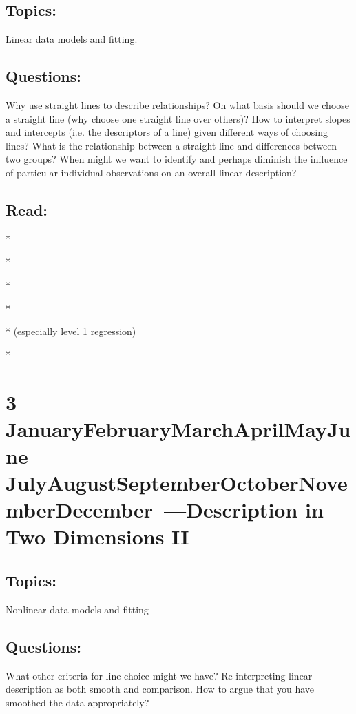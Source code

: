 \documentclass[10pt]{article}
\def\themonth{\ifcase\month\or
	January\or February\or March\or April\or May\or June\or
	July\or August\or September\or October\or November\or December\fi}
\begin{document}
\subsection{Topics:}  Linear data models and fitting.

\subsection{Questions:} Why use straight lines to describe relationships? On
what basis should we choose a straight line (why choose one straight line over
others)? How to interpret slopes and intercepts (i.e. the descriptors of a
line) given different ways of choosing lines? What is the relationship between
a straight line and differences between two groups? When might we want to
identify and perhaps diminish the influence of particular individual
observations on an overall linear description?

\subsection{Read:}

*\citealp[Chap 2]{achen82}

*\citealp[Chap 4,5--8]{kaplan2012ism}

*\citealp[Chap 2--3]{james2013introduction}

*\citealp[Chap 1]{berk2008statistical}

*\citealp{berk2010you} (especially level 1 regression)

*\citealp[Chap 5 and 10]{wilcox2012introduction}

\AdvanceDate[7]
\section{3---\themonth~\the\day---Description in Two Dimensions II}

\subsection{Topics:} Nonlinear data models and fitting

\subsection{Questions:} What other criteria for line choice might we have?
Re-interpreting linear description as both smooth and comparison. How to argue
that you have smoothed the data appropriately?
\end{document}
